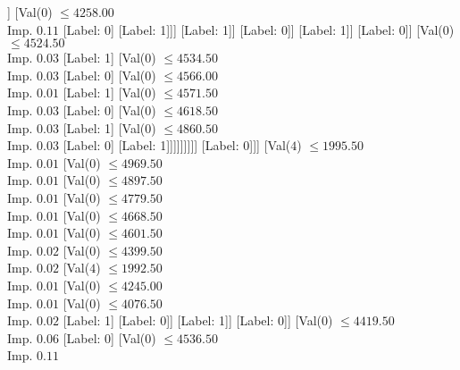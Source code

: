 \documentclass[margin=10pt]{standalone}
\begin{document}
\begin{forest}
																		[Val($0$) $ \leq 4235.50$ \\ Imp. $0.03$
																			[Val($0$) $ \leq 4223.50$ \\ Imp. $0.08$
																				[Label: 0]
																				[Label: 1]]
																			[Val($0$) $ \leq 4258.00$ \\ Imp. $0.11$
																				[Label: 0]
																				[Label: 1]]]
																		[Label: 1]]
																	[Label: 0]]
																[Label: 1]]
															[Label: 0]]
														[Val($0$) $ \leq 4524.50$ \\ Imp. $0.03$
															[Label: 1]
															[Val($0$) $ \leq 4534.50$ \\ Imp. $0.03$
																[Label: 0]
																[Val($0$) $ \leq 4566.00$ \\ Imp. $0.01$
																	[Label: 1]
																	[Val($0$) $ \leq 4571.50$ \\ Imp. $0.03$
																		[Label: 0]
																		[Val($0$) $ \leq 4618.50$ \\ Imp. $0.03$
																			[Label: 1]
																			[Val($0$) $ \leq 4860.50$ \\ Imp. $0.03$
																				[Label: 0]
																				[Label: 1]]]]]]]]]
												[Label: 0]]]
										[Val($4$) $ \leq 1995.50$ \\ Imp. $0.01$
											[Val($0$) $ \leq 4969.50$ \\ Imp. $0.01$
												[Val($0$) $ \leq 4897.50$ \\ Imp. $0.01$
													[Val($0$) $ \leq 4779.50$ \\ Imp. $0.01$
														[Val($0$) $ \leq 4668.50$ \\ Imp. $0.01$
															[Val($0$) $ \leq 4601.50$ \\ Imp. $0.02$
																[Val($0$) $ \leq 4399.50$ \\ Imp. $0.02$
																	[Val($4$) $ \leq 1992.50$ \\ Imp. $0.01$
																		[Val($0$) $ \leq 4245.00$ \\ Imp. $0.01$
																			[Val($0$) $ \leq 4076.50$ \\ Imp. $0.02$
																				[Label: 1]
																				[Label: 0]]
																			[Label: 1]]
																		[Label: 0]]
																	[Val($0$) $ \leq 4419.50$ \\ Imp. $0.06$
																		[Label: 0]
																		[Val($0$) $ \leq 4536.50$ \\ Imp. $0.11$

\end{forest}
\end{document}
